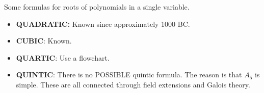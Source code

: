Some formulas for roots of polynomials in a single variable.
\begin{itemize}
\setlength\itemsep{-.2em}
    \item \textbf{QUADRATIC:} Known since approximately 1000 BC.
    \item \textbf{CUBIC}: Known.
    \item \textbf{QUARTIC}: Use a flowchart.
    \item \textbf{QUINTIC}: There is no POSSIBLE quintic formula. The reason is that $A_5$ is simple. These are all connected through field extensions and Galois theory.
\end{itemize}

